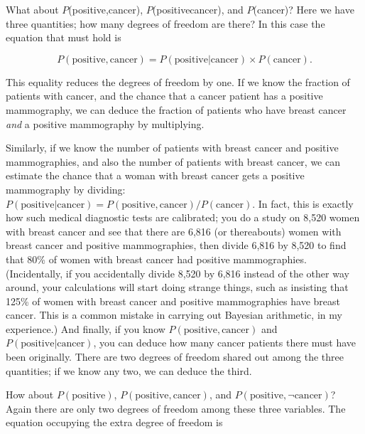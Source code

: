 {{{
 What about $P$(positive,cancer), $P$(positive\textbar cancer), and
$P$(cancer)? Here we have three quantities; how many degrees of freedom
are there? In this case the equation that must hold is}

\begin{equation*}
 P(\text{positive}, \text{cancer}) = P(\text{positive}|\text{cancer}) \times
P(\text{cancer}).
\end{equation*}

{
 This equality reduces the degrees of freedom by one. If we know
the fraction of patients with cancer, and the chance that a cancer
patient has a positive mammography, we can deduce the fraction of
patients who have breast cancer \textit{and} a positive mammography by
multiplying.}

{
 Similarly, if we know the number of patients with breast cancer
and positive mammographies, and also the number of patients with breast
cancer, we can estimate the chance that a woman with breast cancer gets
a positive mammography by dividing: $P(\text{positive}|\text{cancer}) =
P(\text{positive}, \text{cancer})/P(\text{cancer})$. In fact, this is exactly how such
medical diagnostic tests are calibrated; you do a study on 8,520 women
with breast cancer and see that there are 6,816 (or thereabouts) women
with breast cancer and positive mammographies, then divide 6,816 by
8,520 to find that 80\% of women with breast cancer had positive
mammographies. (Incidentally, if you accidentally divide 8,520 by 6,816
instead of the other way around, your calculations will start doing
strange things, such as insisting that 125\% of women with breast
cancer and positive mammographies have breast cancer. This is a common
mistake in carrying out Bayesian arithmetic, in my experience.) And
finally, if you know $P(\text{positive}, \text{cancer})$ and
$P(\text{positive}|\text{cancer})$, you can deduce how many cancer patients
there must have been originally. There are two degrees of freedom
shared out among the three quantities; if we know any two, we can
deduce the third.}

{
 How about $P(\text{positive})$, $P(\text{positive}, \text{cancer})$, and
$P(\text{positive},\lnot\text{cancer})$? Again there are only two degrees of
freedom among these three variables. The equation occupying the extra
degree of freedom is}


}}
